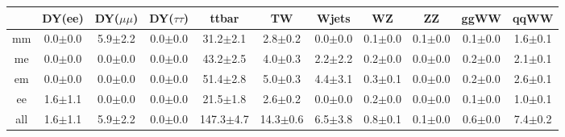 \begin{table}[!ht]
  \begin{center}
 {\small
  \begin{tabular} {|c|c|c|c|c|c|c|c|c|c|c|}
\hline
  & DY(ee) & DY($\mu\mu$) & DY($\tau\tau$) & ttbar & TW & Wjets & WZ & ZZ & ggWW & qqWW \\
  \hline
  \hline
  mm &  0.0$\pm$0.0 &  5.9$\pm$2.2 &  0.0$\pm$0.0 & 31.2$\pm$2.1 &  2.8$\pm$0.2 &  0.0$\pm$0.0 &  0.1$\pm$0.0 &  0.1$\pm$0.0 &  0.1$\pm$0.0 &  1.6$\pm$0.1 \\
  me &  0.0$\pm$0.0 &  0.0$\pm$0.0 &  0.0$\pm$0.0 & 43.2$\pm$2.5 &  4.0$\pm$0.3 &  2.2$\pm$2.2 &  0.2$\pm$0.0 &  0.0$\pm$0.0 &  0.2$\pm$0.0 &  2.1$\pm$0.1 \\
  em &  0.0$\pm$0.0 &  0.0$\pm$0.0 &  0.0$\pm$0.0 & 51.4$\pm$2.8 &  5.0$\pm$0.3 &  4.4$\pm$3.1 &  0.3$\pm$0.1 &  0.0$\pm$0.0 &  0.2$\pm$0.0 &  2.6$\pm$0.1 \\
  ee &  1.6$\pm$1.1 &  0.0$\pm$0.0 &  0.0$\pm$0.0 & 21.5$\pm$1.8 &  2.6$\pm$0.2 &  0.0$\pm$0.0 &  0.2$\pm$0.0 &  0.0$\pm$0.0 &  0.1$\pm$0.0 &  1.0$\pm$0.1 \\
 \hline
 all &  1.6$\pm$1.1 &  5.9$\pm$2.2 &  0.0$\pm$0.0 & 147.3$\pm$4.7 & 14.3$\pm$0.6 &  6.5$\pm$3.8 &  0.8$\pm$0.1 &  0.1$\pm$0.0 &  0.6$\pm$0.0 &  7.4$\pm$0.2 \\


\end{tabular}}
\end{center}
\end{table}

